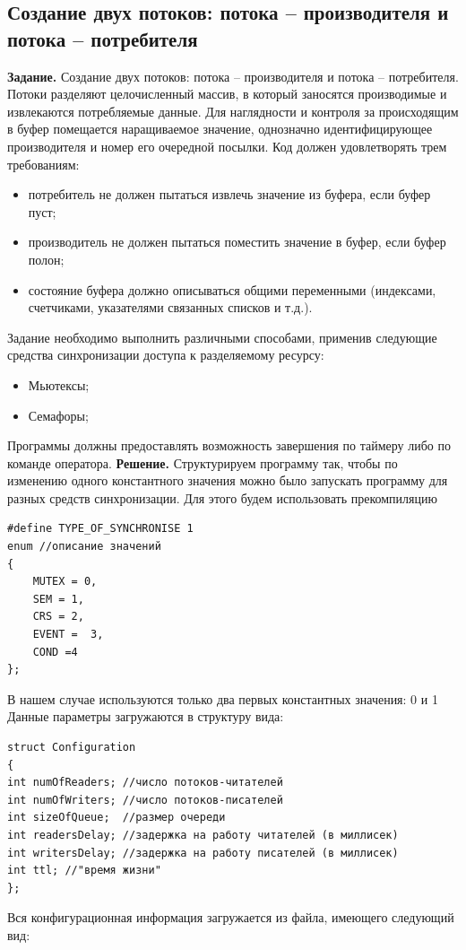 \documentclass[a4paper]{article}
\begin{document}
\subsection{Создание двух потоков: потока – производителя и потока – потребителя}
	\textbf{Задание.} Создание двух потоков: потока – производителя и потока – потребителя.
Потоки разделяют целочисленный массив, в который заносятся производимые и извлекаются потребляемые данные. Для наглядности и контроля за происходящим в буфер помещается наращиваемое значение, однозначно идентифицирующее производителя и номер его очередной посылки.
Код должен удовлетворять трем требованиям:\begin{itemize}
\item потребитель не должен пытаться извлечь значение из буфера, если буфер пуст;
\item производитель не должен пытаться поместить значение в буфер, если буфер полон;
\item состояние буфера должно описываться общими переменными (индексами, счетчиками, указателями связанных списков и т.д.).
\end{itemize}
Задание необходимо выполнить различными способами, применив следующие средства синхронизации доступа к разделяемому ресурсу:
\begin{itemize}
\item Мьютексы;
\item Семафоры;
\end{itemize}
Программы должны предоставлять возможность завершения по таймеру либо по команде оператора.
\textbf{Решение.}
Структурируем программу так, чтобы по изменению одного константного значения можно было запускать программу для разных средств синхронизации. Для этого будем использовать прекомпиляцию
	\begin{lstlisting}[style=crs_cpp]
#define TYPE_OF_SYNCHRONISE 1
enum //описание значений
{
	MUTEX = 0,
	SEM = 1,
	CRS = 2,
	EVENT =  3,
	COND =4
};
	\end{lstlisting}
	В нашем случае используются только два первых константных значения: 0 и 1
Данные параметры загружаются в структуру вида:
	\begin{lstlisting}[style=crs_cpp]
struct Configuration 
{ 
int numOfReaders; //число потоков-читателей 
int numOfWriters; //число потоков-писателей 
int sizeOfQueue;  //размер очереди 
int readersDelay; //задержка на работу читателей (в миллисек) 
int writersDelay; //задержка на работу писателей (в миллисек) 
int ttl; //"время жизни" 
};
	\end{lstlisting}
Вся конфигурационная информация загружается из файла, имеющего следующий вид:
\end{document}
